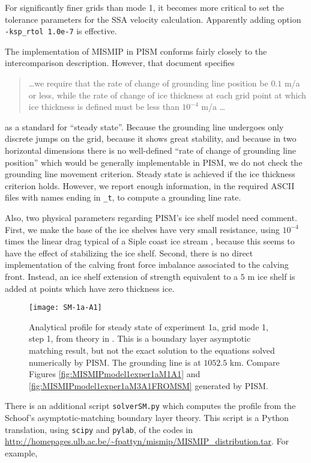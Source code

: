For significantly finer grids than mode 1, it becomes more critical to set the tolerance parameters for the SSA velocity calculation.  Apparently adding option \verb|-ksp_rtol 1.0e-7| is effective.

The implementation of MISMIP in PISM conforms fairly closely to the intercomparison description.  However, that document specifies
\begin{quotation}
\dots we require that the rate of change of grounding line position be $0.1$ m/a or less, while the rate of change of ice thickness at each grid point at which ice thickness is defined must be less than $10^{-4}$ m/a \dots
\end{quotation}
as a standard for ``steady state''.  Because the grounding line undergoes only discrete jumps on the grid, because it shows great stability, and because in two horizontal dimensions there is no well-defined ``rate of change of grounding line position'' which would be generally implementable in PISM, we do not check the grounding line movement criterion.  Steady state is achieved if the ice thickness criterion holds.  However, we report enough information, in the required ASCII files with names ending in \verb|_t|, to compute a grounding line rate.

Also, two physical parameters regarding PISM's ice shelf model need comment.  First, we make the base of the ice shelves have very small resistance, using $10^{-4}$ times the linear drag typical of a Siple coast ice stream \cite{HulbeMacAyeal}, because this seems to have the effect of stabilizing the ice shelf.  Second, there is no direct implementation of the calving front force imbalance associated to the calving front.  Instead, an ice shelf extension of strength equivalent to a $5$ m ice shelf is added at points which have zero thickness ice.


\begin{figure}[ht]
\texttt{[image: SM-1a-A1]}
\caption{Analytical profile for steady state of experiment 1a, grid mode 1, step 1, from theory in \cite{SchoofMarine1}.  This is a boundary layer asymptotic matching result, but not the exact solution to the equations solved numerically by PISM.  The grounding line is at $1052.5$ km.  Compare Figures \ref{fig:MISMIPmodel1exper1aM1A1} and \ref{fig:MISMIPmodel1exper1aM3A1FROMSM} generated by PISM.}
\label{fig:SMexper1aM1A1}
\end{figure}

There is an additional script \verb|solverSM.py| which computes the profile from the Schoof's \cite{SchoofMarine1} asymptotic-matching boundary layer theory.  This script is a Python translation, using \verb|scipy| and \verb|pylab|, of the \Matlab codes in \url{http://homepages.ulb.ac.be/~fpattyn/mismip/MISMIP_distribution.tar}.  For example,

